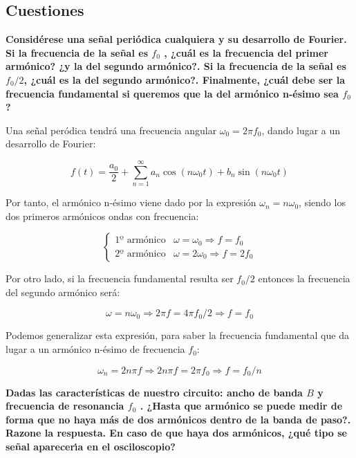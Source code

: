 \documentclass[a4paper,12pt,titlepage]{article}
\begin{document}
\subsection{Cuestiones}

\textbf{Considérese una señal periódica cualquiera y su desarrollo de Fourier. Si la frecuencia de la señal es $f_0$ , ¿cuál es la frecuencia del primer armónico? ¿y la del segundo armónico?. Si la frecuencia de la señal es $f_0/2$, ¿cuál es la del segundo armónico?. Finalmente, ¿cuál debe ser la frecuencia fundamental si queremos que la del armónico n-ésimo sea $f_0$?}

Una señal peródica tendrá una frecuencia angular $\omega_0=2\pi f_0$, dando lugar a un desarrollo de Fourier:

\begin{equation}
    f(t) = \frac{a_0}{2} + \sum_{n=1}^{\infty} a_n \cos (n\omega_0 t) + b_n \sin (n\omega_0 t)
\end{equation}

Por tanto, el armónico n-ésimo viene dado por la expresión $\omega_n=n\omega_0$, siendo los dos primeros armónicos ondas con frecuencia:

\begin{equation}
    \left\{\begin{array}{ll}
        \text{1º armónico} &  \omega=\omega_0 \Rightarrow f = f_0\\
        \text{2º armónico} &  \omega=2\omega_0 \Rightarrow f = 2f_0
    \end{array} \right.
\end{equation}

Por otro lado, si la frecuencia fundamental resulta ser $f_0/2$ entonces la frecuencia del segundo armónico será:

\begin{equation}
    \omega = n\omega_0 \Rightarrow 2\pi f = 4\pi f_0/2 \Rightarrow f = f_0
\end{equation}

Podemos generalizar esta expresión, para saber la frecuencia fundamental que da lugar a un armónico n-ésimo de frecuencia $f_0$:

\begin{equation}
    \omega_n = 2n\pi f \Rightarrow 2n\pi f = 2\pi f_0 \Rightarrow f = f_0/n
\end{equation}

\textbf{Dadas las características de nuestro circuito: ancho de banda $B$ y frecuencia de resonancia $f_0$ . ¿Hasta que armónico se puede medir de forma que no haya más de dos armónicos dentro de la banda de paso?. Razone la respuesta. En caso de que haya dos armónicos, ¿qué tipo se señal aparecerı́a en el osciloscopio?}
\end{document}
